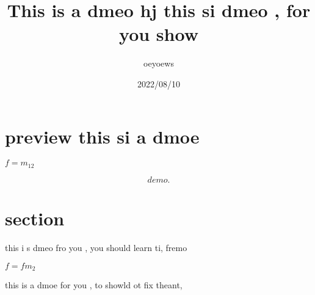 \documentclass{article}
\title{This is a dmeo hj this si dmeo , for you show }
\author{oeyoews}
\date{2022/08/10}
\begin{document}
\maketitle


\section{preview this si a dmoe}%
\label{sec:preview this si a dmoe}

$f = m_{12} $

\[
  demo
.\]

 \newpage

 \section{section}%
 \label{sec:section}
 this i s dmeo fro you , you should learn ti, fremo

 $f = fm_2$

 this is a dmoe for you , to showld ot fix theant,
\end{document}
